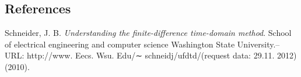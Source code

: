 \documentclass{article}
\begin{document}
    \subsection*{References}\label{references}

Schneider, J. B. \emph{Understanding the finite-difference time-domain
method}. School of electrical engineering and computer science
Washington State University.--URL: http://www. Eecs. Wsu. Edu/∼
schneidj/ufdtd/(request data: 29.11. 2012) (2010).


    
    
    
    
\end{document}
